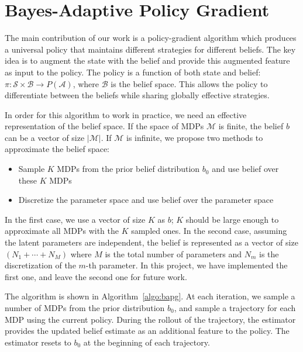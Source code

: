 \documentclass{article}
\newcommand{\aref}[1]{Algorithm~\ref{#1}}%
\begin{document}

\section{Bayes-Adaptive Policy Gradient}



The main contribution of our work is a policy-gradient algorithm which produces a universal policy that maintains different strategies for different beliefs. The key idea is to augment the state with the belief and provide this augmented feature as input to the policy. The policy is a function of both state and belief: $\pi: \mathcal{S} \times \mathcal{B} \rightarrow P(\mathcal{A})$, where $\mathcal{B}$ is the belief space. This allows the policy to differentiate between the beliefs while sharing globally effective strategies.

In order for this algorithm to work in practice, we need an effective representation of the belief space. If the space of MDPs $\mathcal{M}$ is finite, the belief $b$ can be a vector of size $|\mathcal{M}|$. If $\mathcal{M}$ is infinite, we propose two methods to approximate the belief space:

\begin{itemize}
    \item Sample $K$ MDPs from the prior belief distribution $b_0$ and use belief over these $K$ MDPs
    \item Discretize the parameter space and use belief over the parameter space
\end{itemize}
In the first case, we use a vector of size $K$ as $b$; $K$ should be large enough to approximate all MDPs with the $K$ sampled ones. In the second case, assuming the latent parameters are independent, the belief is represented as a vector of size $(N_1 + \cdots + N_M)$ where $M$ is the total number of parameters and $N_m$ is the discretization of the $m$-th parameter. In this project, we have implemented the first one, and leave the second one for future work.

The algorithm is shown in \aref{algo:bapg}. At each iteration, we sample a number of MDPs from the prior distribution $b_0$, and sample a trajectory for each MDP using the current policy. During the rollout of the trajectory, the estimator provides the updated belief estimate as an additional feature to the policy. The estimator resets to $b_0$ at the beginning of each trajectory.
\end{document}
